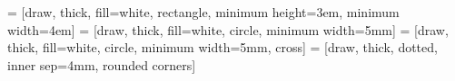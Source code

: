 \newcommand{\overbar}[1]{\mkern 1.5mu\overline{\mkern-1.5mu#1\mkern-1.5mu}\mkern 1.5mu}
\newcommand{\vect}[1]{{\overbar{{#1}}}}

\newcommand{\numberset}{\mathbb}
\newcommand{\N}{\numberset{N}}
\newcommand{\Z}{\numberset{Z}}
\newcommand{\R}{\numberset{R}}

\renewcommand{\rho}{\varrho}
\renewcommand{\phi}{\varphi}
\renewcommand{\theta}{\vartheta}
\renewcommand{\epsilon}{\varepsilon}

 = [draw, thick, fill=white, rectangle, minimum height=3em, minimum width=4em]
 = 	[draw, thick, fill=white, circle, minimum width=5mm]
 =	[draw, thick, fill=white, circle, minimum width=5mm, cross]
 =	[draw, thick, dotted, inner sep=4mm, rounded corners]

